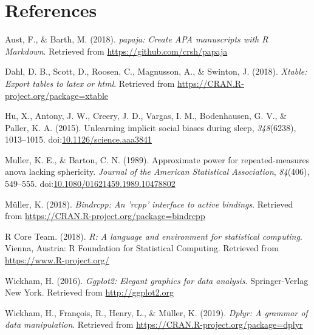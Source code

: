 \documentclass[man,floatsintext]{apa6}
\begin{document}
\newpage

\section{References}\label{references}

\begingroup
\setlength{\parindent}{-0.5in} \setlength{\leftskip}{0.5in}

\hypertarget{refs}{}
\hypertarget{ref-R-papaja}{}
Aust, F., \& Barth, M. (2018). \emph{papaja: Create APA manuscripts with
R Markdown}. Retrieved from \url{https://github.com/crsh/papaja}

\hypertarget{ref-R-xtable}{}
Dahl, D. B., Scott, D., Roosen, C., Magnusson, A., \& Swinton, J.
(2018). \emph{Xtable: Export tables to latex or html}. Retrieved from
\url{https://CRAN.R-project.org/package=xtable}

\hypertarget{ref-Hu1013}{}
Hu, X., Antony, J. W., Creery, J. D., Vargas, I. M., Bodenhausen, G. V.,
\& Paller, K. A. (2015). Unlearning implicit social biases during sleep,
\emph{348}(6238), 1013--1015.
doi:\href{https://doi.org/10.1126/science.aaa3841}{10.1126/science.aaa3841}

\hypertarget{ref-Keith1989}{}
Muller, K. E., \& Barton, C. N. (1989). Approximate power for
repeated-measures anova lacking sphericity. \emph{Journal of the
American Statistical Association}, \emph{84}(406), 549--555.
doi:\href{https://doi.org/10.1080/01621459.1989.10478802}{10.1080/01621459.1989.10478802}

\hypertarget{ref-R-bindrcpp}{}
Müller, K. (2018). \emph{Bindrcpp: An 'rcpp' interface to active
bindings}. Retrieved from
\url{https://CRAN.R-project.org/package=bindrcpp}

\hypertarget{ref-R-base}{}
R Core Team. (2018). \emph{R: A language and environment for statistical
computing}. Vienna, Austria: R Foundation for Statistical Computing.
Retrieved from \url{https://www.R-project.org/}

\hypertarget{ref-R-ggplot2}{}
Wickham, H. (2016). \emph{Ggplot2: Elegant graphics for data analysis}.
Springer-Verlag New York. Retrieved from \url{http://ggplot2.org}

\hypertarget{ref-R-dplyr}{}
Wickham, H., François, R., Henry, L., \& Müller, K. (2019). \emph{Dplyr:
A grammar of data manipulation}. Retrieved from
\url{https://CRAN.R-project.org/package=dplyr}

\endgroup
\end{document}
